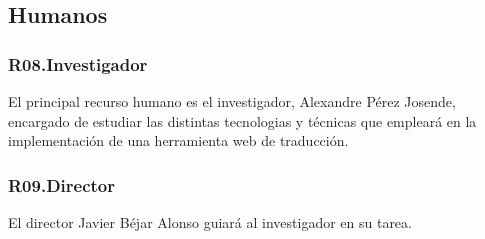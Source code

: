 \subsection{Humanos}
\subsubsection{R08.\quad Investigador}\label{R08}
El principal recurso humano es el investigador, Alexandre Pérez Josende,
encargado de estudiar las distintas tecnologias y técnicas que empleará en la
implementación de una herramienta web de traducción.

\subsubsection{R09.\quad Director}\label{R09}
El director Javier Béjar Alonso guiará al investigador en su tarea.

